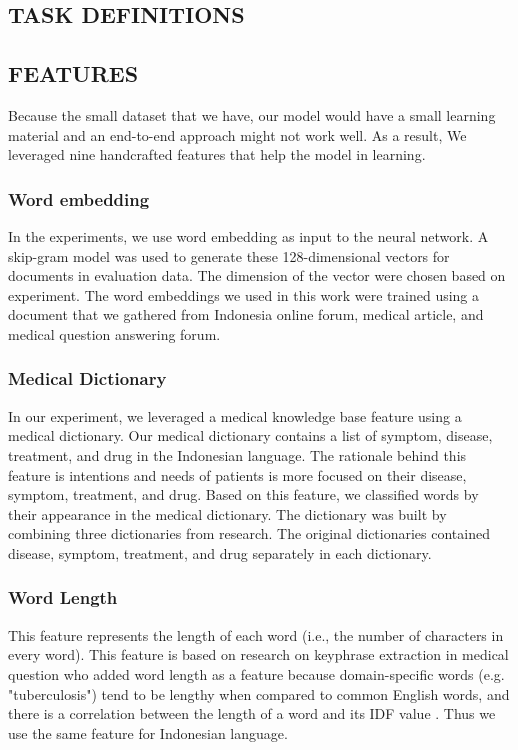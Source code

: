 \subsection{TASK DEFINITIONS}

\subsection{FEATURES}
Because the small dataset that we have, our model would have a small learning material and an end-to-end approach might not work well. As a result, We leveraged nine handcrafted features that help the model in learning.
\subsubsection{Word embedding\\}
In the experiments, we use word embedding as input to the neural network. A skip-gram model \cite{mikolov2013wordembed} was used to generate these 128-dimensional vectors for documents in evaluation data. The dimension of the vector were chosen based on \cite{skripsiWahid} experiment. The word embeddings we used in this work were trained using a document that we gathered from Indonesia online forum, medical article, and medical question answering forum. 

\subsubsection{Medical Dictionary\\}
In our experiment, we leveraged a medical knowledge base feature using a medical dictionary. Our medical dictionary contains a list of symptom, disease, treatment, and drug in the Indonesian language. The rationale behind this feature is intentions and needs of patients is more focused on their disease, symptom, treatment, and drug. Based on this feature, we classified words by their appearance in the medical dictionary. The dictionary was built by combining three dictionaries from \cite{skripsiKakAbid} research. The original dictionaries contained disease, symptom, treatment, and drug separately in each dictionary.

\subsubsection{Word Length\\}
This feature represents the length of each word (i.e., the number of characters in every word). This feature is based on \cite{cao2010automatically} research on keyphrase extraction in medical question who added word length as a feature because domain-specific words (e.g. "tuberculosis") tend to be lengthy when compared to common English words, and there is a correlation between the length of a word and its IDF value \citep{cao2010automatically}. Thus we use the same feature for Indonesian language.

